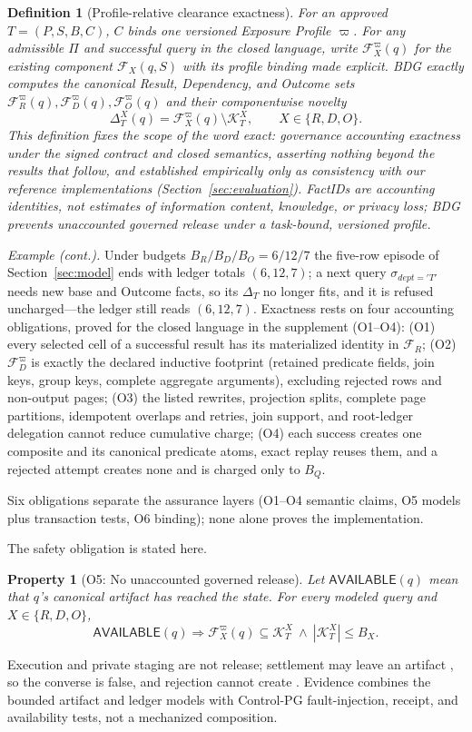 \documentclass[10pt,journal,compsoc]{IEEEtran}
\newcommand{\code}[1]{\texttt{\detokenize{#1}}}
\newcommand{\facts}{\mathcal{F}}
\newcommand{\accounted}{\mathcal{K}}
\newtheorem{definition}{Definition}
\newtheorem{property}{Property}
\begin{document}
\begin{definition}[Profile-relative clearance exactness]
\label{def:profile-relative-exactness}
For an approved $T=(P,S,B,C)$, $C$ binds one versioned Exposure Profile $\varpi$.
For any admissible $\Pi$ and successful query in the closed language, write
$\facts_X^\varpi(q)$ for the existing component $\facts_X(q,S)$ with its profile
binding made explicit. BDG exactly computes the canonical Result, Dependency,
and Outcome sets $\facts_R^\varpi(q),\facts_D^\varpi(q),\facts_O^\varpi(q)$ and their
componentwise novelty
\[
 \Delta_T^X(q)=\facts_X^\varpi(q)\setminus\accounted_T^X,
 \qquad X\in\{R,D,O\}.
\]
This definition fixes the scope of the word \emph{exact}: governance
accounting exactness under the signed contract and closed semantics,
asserting nothing beyond the results that follow, and established
empirically only as consistency with our reference implementations
(Section~\ref{sec:evaluation}). FactIDs are accounting identities, not
estimates of information content, knowledge, or privacy loss; BDG prevents
unaccounted governed release under a task-bound, versioned profile.
\end{definition}
\emph{Example (cont.).} Under budgets $B_R/B_D/B_O=6/12/7$ the five-row
episode of Section~\ref{sec:model} ends with ledger totals $(6,12,7)$; a
next query $\sigma_{dept='T'}$ needs new base and Outcome facts, so its
$\Delta_T$ no longer fits, and it is refused uncharged---the ledger still
reads $(6,12,7)$.
Exactness rests on four accounting obligations, proved for the closed
language in the supplement (O1--O4): (O1) every selected cell of a successful result
has its materialized identity in $\facts_R$; (O2) $\facts_D^\varpi$ is exactly
the declared inductive footprint (retained predicate fields, join keys, group
keys, complete aggregate arguments), excluding rejected rows and non-output
pages; (O3) the listed rewrites, projection splits, complete page partitions,
idempotent overlaps and retries, join support, and root-ledger delegation
cannot reduce cumulative charge; (O4) each success creates one composite and
its canonical predicate atoms, exact replay reuses them, and a rejected
attempt creates none and is charged only to $B_Q$.

Six obligations separate the assurance layers (O1--O4 semantic claims, O5
models plus transaction tests, O6 binding); none alone proves the
implementation.

The safety obligation is stated here.

\begin{property}[O5: No unaccounted governed release]
\label{prop:no-unaccounted-release}
Let $\mathsf{AVAILABLE}(q)$ mean that $q$'s canonical artifact has reached the
\code{AVAILABLE} state. For every modeled query and $X\in\{R,D,O\}$,
\[
 \mathsf{AVAILABLE}(q)\Longrightarrow
 \facts_X^\varpi(q)\subseteq\accounted_T^X
 \ \wedge\ |\accounted_T^X|\leq B_X.
\]
\end{property}
Execution and private staging are not release; settlement may leave an
artifact \code{PENDING}, so the converse is false, and rejection cannot
create \code{AVAILABLE}. Evidence combines the bounded artifact and ledger
models with Control-PG fault-injection, receipt, and availability tests, not
a mechanized composition.
\end{document}
